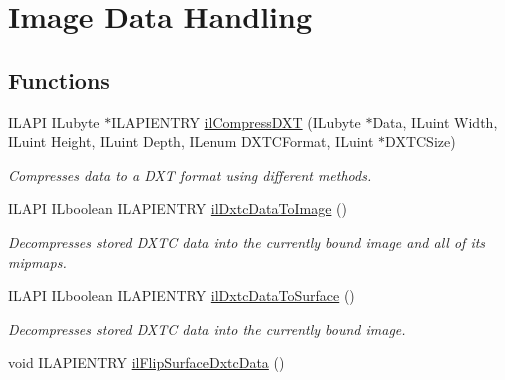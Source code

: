 \hypertarget{group__data}{\section{Image Data Handling}
\label{group__data}
}
\subsection*{Functions}
\begin{DoxyCompactItemize}
\item 
I\+L\+A\+P\+I I\+Lubyte $\ast$I\+L\+A\+P\+I\+E\+N\+T\+R\+Y \hyperlink{group__data_ga016b03ccbf86f6ba37d6c24b3357f9d1}{il\+Compress\+D\+X\+T} (I\+Lubyte $\ast$Data, I\+Luint Width, I\+Luint Height, I\+Luint Depth, I\+Lenum D\+X\+T\+C\+Format, I\+Luint $\ast$D\+X\+T\+C\+Size)
\begin{DoxyCompactList}\small\item\em Compresses data to a D\+X\+T format using different methods. \end{DoxyCompactList}\item 
\hypertarget{group__data_ga8faac0b5b4f410b903b1bc4b825fc345}{I\+L\+A\+P\+I I\+Lboolean I\+L\+A\+P\+I\+E\+N\+T\+R\+Y \hyperlink{group__data_ga8faac0b5b4f410b903b1bc4b825fc345}{il\+Dxtc\+Data\+To\+Image} ()}\label{group__data_ga8faac0b5b4f410b903b1bc4b825fc345}

\begin{DoxyCompactList}\small\item\em Decompresses stored D\+X\+T\+C data into the currently bound image and all of its mipmaps. \end{DoxyCompactList}\item 
\hypertarget{group__data_ga1357342a2f78514311614044bc6adee2}{I\+L\+A\+P\+I I\+Lboolean I\+L\+A\+P\+I\+E\+N\+T\+R\+Y \hyperlink{group__data_ga1357342a2f78514311614044bc6adee2}{il\+Dxtc\+Data\+To\+Surface} ()}\label{group__data_ga1357342a2f78514311614044bc6adee2}

\begin{DoxyCompactList}\small\item\em Decompresses stored D\+X\+T\+C data into the currently bound image. \end{DoxyCompactList}\item 
\hypertarget{group__data_ga275bf97933de4ca996bcceeee3a58621}{void I\+L\+A\+P\+I\+E\+N\+T\+R\+Y \hyperlink{group__data_ga275bf97933de4ca996bcceeee3a58621}{il\+Flip\+Surface\+Dxtc\+Data} ()}\label{group__data_ga275bf97933de4ca996bcceeee3a58621}


\end{DoxyCompactItemize}
